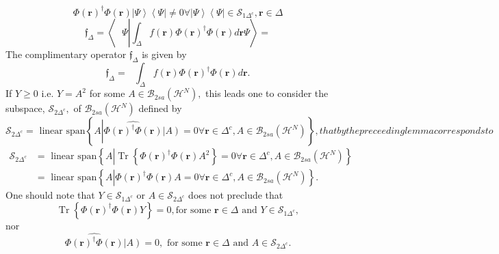 \documentclass[aps,preprint]{revtex4}%
\begin{document}
\begin{equation}
\Phi\left(  \boldsymbol{r}\right)  ^{\dagger}\Phi\left(  \boldsymbol{r}%
\right)  \left\vert \Psi\right\rangle \left\langle \Psi\right\vert
\neq0\forall\left\vert \Psi\right\rangle \left\langle \Psi\right\vert
\in\mathcal{S}_{1\Delta^{c}},\boldsymbol{r}\in\Delta
\end{equation}%
\begin{equation}
\mathfrak{f}_{\Delta}=\left\langle \text{ }\Psi\left\vert \int_{\Delta
}f\left(  \boldsymbol{r}\right)  \Phi\left(  \boldsymbol{r}\right)  ^{\dagger
}\Phi\left(  \boldsymbol{r}\right)  d\boldsymbol{r}\right.  \Psi\right\rangle
=
\end{equation}
The complimentary operator $\mathfrak{f}_{\Delta}$ is given by
\begin{equation}
\mathfrak{f}_{\Delta}=\text{ }\int_{\Delta}f\left(  \boldsymbol{r}\right)
\Phi\left(  \boldsymbol{r}\right)  ^{\dagger}\Phi\left(  \boldsymbol{r}%
\right)  d\boldsymbol{r}.
\end{equation}
If $Y\geq0$ i.e. $Y=A^{2}$ for some $A\in\mathcal{B}_{2sa}\left(
\mathcal{H}^{N}\right)  ,$ this leads one to consider the subspace,
$\mathcal{S}_{2\Delta^{c}},$ of $\mathcal{B}_{2sa}\left(  \mathcal{H}%
^{N}\right)  $ defined by
\begin{subequations}
\begin{equation}
\mathcal{S}_{2\Delta^{c}}=\text{ linear span}\left\{  A\left\vert
\widehat{\Phi\left(  \boldsymbol{r}\right)  ^{\dagger}\Phi\left(
\boldsymbol{r}\right)  }\left\vert A\right)  =0\forall\boldsymbol{r}\in
\Delta^{c},A\in\mathcal{B}_{2sa}\left(  \mathcal{H}^{N}\right)  \right.
\right\}  ,
\end{equation}
that by the preceeding lemma corresponds to
\end{subequations}
\begin{align}
\mathcal{S}_{2\Delta^{c}}  &  =\text{ linear span}\left\{  A\left\vert
\operatorname*{Tr}\left\{  \Phi\left(  \boldsymbol{r}\right)  ^{\dagger}%
\Phi\left(  \boldsymbol{r}\right)  A^{2}\right\}  =0\forall\boldsymbol{r}%
\in\Delta^{c},A\in\mathcal{B}_{2sa}\left(  \mathcal{H}^{N}\right)  \right.
\right\} \nonumber\\
&  =\text{ linear span}\left\{  A\left\vert \Phi\left(  \boldsymbol{r}\right)
^{\dagger}\Phi\left(  \boldsymbol{r}\right)  A=0\forall\boldsymbol{r}\in
\Delta^{c},A\in\mathcal{B}_{2sa}\left(  \mathcal{H}^{N}\right)  \right.
\right\}  .
\end{align}
One should note that $Y\in\mathcal{S}_{1\Delta^{c}}$ or $A\in\mathcal{S}%
_{2\Delta^{c}}$ does not preclude that
\begin{equation}
\operatorname*{Tr}\left\{  \Phi\left(  \boldsymbol{r}\right)  ^{\dagger}%
\Phi\left(  \boldsymbol{r}\right)  Y\right\}  =0,\text{for some }%
\boldsymbol{r}\in\Delta\text{ and }Y\in\mathcal{S}_{1\Delta^{c}},
\end{equation}
nor
\begin{equation}
\widehat{\Phi\left(  \boldsymbol{r}\right)  ^{\dagger}\Phi\left(
\boldsymbol{r}\right)  }\left\vert A\right)  =0,\text{ for some }%
\boldsymbol{r}\in\Delta\text{ and }A\in\mathcal{S}_{2\Delta^{c}}.
\end{equation}
\end{document}
